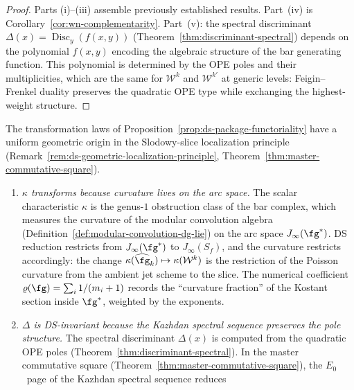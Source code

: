 \begin{proof}
Parts (i)--(iii) assemble previously established results.
Part~(iv) is
Corollary~\ref{cor:wn-complementarity}.
Part~(v): the spectral discriminant
$\Delta(x) = \operatorname{Disc}_y(f(x,y))$
(Theorem~\ref{thm:discriminant-spectral})
depends on the polynomial $f(x,y)$ encoding the algebraic
structure of the bar generating function.  This polynomial
is determined by the OPE poles and their multiplicities,
which are the same for $\mathcal{W}^k$ and $\mathcal{W}^{k'}$
at generic levels: Feigin--Frenkel duality preserves the
quadratic OPE type while exchanging the highest-weight structure.
\end{proof}

\begin{remark}
\label{rem:ds-package-geometric-origin}
The transformation laws of
Proposition~\ref{prop:ds-package-functoriality} have a uniform
geometric origin in the Slodowy-slice localization principle
(Remark~\ref{rem:ds-geometric-localization-principle},
Theorem~\ref{thm:master-commutative-square}).
\begin{enumerate}[label=\textup{(\roman*)}]
\item \emph{$\kappa$ transforms because curvature lives on the arc
  space.}  The scalar characteristic $\kappa$ is the genus-$1$
  obstruction class of the bar complex, which measures the curvature
  of the modular convolution algebra
  (Definition~\ref{def:modular-convolution-dg-lie}) on the arc space
  $J_\infty(\fg^*)$.  DS reduction restricts from $J_\infty(\fg^*)$
  to $J_\infty(S_f)$, and the curvature restricts accordingly:
  the change $\kappa(\widehat{\fg}_k) \mapsto
  \kappa(\mathcal{W}^k)$ is the restriction of the Poisson curvature
  from the ambient jet scheme to the slice.  The numerical coefficient
  $\varrho(\fg) = \sum_i 1/(m_i+1)$ records the ``curvature fraction''
  of the Kostant section inside $\fg^*$, weighted by the exponents.
\item \emph{$\Delta$ is DS-invariant because the Kazhdan spectral
  sequence preserves the pole structure.}
  The spectral discriminant $\Delta(x)$ is computed from
  the quadratic OPE poles
  (Theorem~\ref{thm:discriminant-spectral}).
  In the master commutative square
  (Theorem~\ref{thm:master-commutative-square}), the
  $E_0$~page of the Kazhdan spectral sequence reduces

\end{enumerate}
\end{remark}
